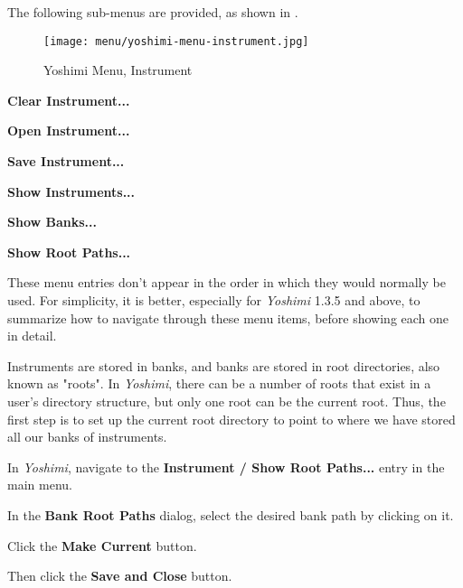    The following sub-menus are provided, as shown in
   .

\begin{figure}[H]
   \centering 
   \texttt{[image: menu/yoshimi-menu-instrument.jpg]}
   \caption{Yoshimi Menu, Instrument}
   \label{fig:yoshimi_instrument_menu}
\end{figure}

   \begin{enumber}
      \item \textbf{Clear Instrument...}
      \item \textbf{Open Instrument...}
      \item \textbf{Save Instrument...}
      \item \textbf{Show Instruments...}
      \item \textbf{Show Banks...}
      \item \textbf{Show Root Paths...}
   \end{enumber}

   These menu entries don't appear in the order in which they would normally
   be used.  For simplicity, it is better, especially for \textsl{Yoshimi}
   1.3.5 and above, to summarize how to navigate through these menu items,
   before showing each one in detail.

   \setcounter{ItemCounter}{0}      %

   Instruments are stored in banks, and banks are stored in root directories,
   also known as "roots".  In \textsl{Yoshimi}, there can be a number of
   roots that exist in a user's directory structure, but only one root can be
   the current root.  Thus, the first step is to set up the current root
   directory to point to where we have stored all our banks of instruments.

   \begin{enumber}
      \item In \textsl{Yoshimi}, navigate to the \textbf{Instrument / Show
      Root Paths...} entry in the main menu.
      \item In the \textbf{Bank Root Paths} dialog, select the desired
      bank path by clicking on it.
      \item Click the \textbf{Make Current} button.
      \item Then click the \textbf{Save and Close} button.
   \end{enumber}

